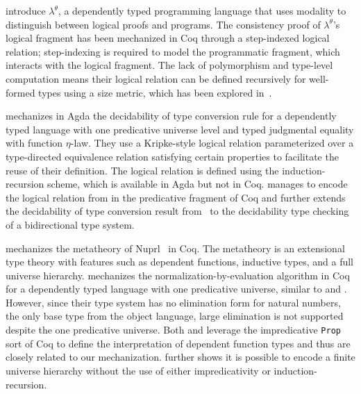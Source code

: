 \documentclass[acmsmall,screen=true,
\ifpublic review=false\else,review=true\fi
  ,anonymous=\ifanonymous true\else false\fi]{acmart}
\newcommand{\yl}[1]{}
\begin{document}
\citet{casinghino:combining-proofs-programs} introduce $\lambda^\theta$, a dependently typed
programming language that uses modality to distinguish between logical
proofs and programs. %
The consistency proof of $\lambda^\theta$'s logical fragment has been
mechanized in Coq through a step-indexed logical relation;
step-indexing is required to model the programmatic fragment, which
interacts with the logical fragment.
The lack of polymorphism and type-level computation means their
logical relation can be defined recursively for well-formed types using
a size metric, which has been explored in~\citet{liu2023dependently}.

\citet{decagda} mechanizes in Agda the decidability of type
conversion rule for a dependently typed language with one predicative
universe level and typed judgmental equality with function
$\eta$-law. They
use a Kripke-style logical relation parameterized over a
type-directed equivalence relation satisfying certain
properties to facilitate the reuse of their definition. The
logical relation is defined using the induction-recursion scheme,
which is available in Agda but not in Coq.
\citet{martin-lof-a-la-coq} manages to encode the logical relation
from \citet{decagda} in the predicative fragment of Coq and further
extends the decidability of type conversion result
from~\citet{decagda} to the decidability type checking of a
bidirectional type system.

\citet{anand2014towards} mechanizes the metatheory of
Nuprl~\citep{constable1986implementing} in Coq. The metatheory is an
extensional type theory with features such as dependent functions,
inductive types, and a full universe hierarchy. \citet{nbeincoq}
mechanizes the normalization-by-evaluation algorithm in Coq for a
dependently typed language with one predicative universe, similar to
\citet{decagda} and \citet{martin-lof-a-la-coq}. However, since their
type system has no elimination form for natural numbers, the
only base type from the object language, large elimination is not
supported despite the one predicative universe.
Both \citet{anand2014towards} and \citet{nbeincoq} leverage the
impredicative \texttt{Prop} sort of Coq to define the interpretation
of dependent function types and thus are closely related to our
mechanization. \citet{anand2014towards} further shows it is possible
to encode a finite universe hierarchy without the use of
either impredicativity or induction-recursion.
\end{document}
